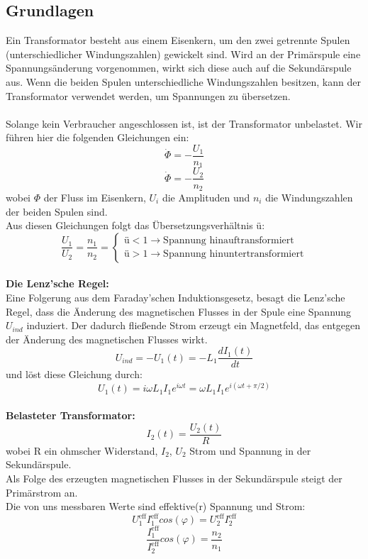 \documentclass{article}
\begin{document}
\subsection{Grundlagen}
Ein Transformator besteht aus einem Eisenkern, um den zwei getrennte Spulen (unterschiedlicher Windungszahlen) gewickelt sind. Wird an der Primärspule eine Spannungsänderung vorgenommen, wirkt sich diese auch auf die Sekundärspule aus. Wenn die beiden Spulen unterschiedliche Windungszahlen besitzen, kann der Transformator verwendet werden, um Spannungen zu übersetzen.\\
\\
Solange kein Verbraucher angeschlossen ist, ist der Transformator unbelastet. Wir führen hier die folgenden Gleichungen ein: \\
$$\dot{\Phi}=-\frac{U_1}{n_1}$$
$$\dot{\Phi}=-\frac{U_2}{n_2}$$
wobei $\Phi$ der Fluss im Eisenkern, $U_i$ die Amplituden und $n_i$ die Windungszahlen der beiden Spulen sind. \\
Aus diesen Gleichungen folgt das Übersetzungsverhältnis ü:\\

\begin{equation}
\label{uebersetzungsverhaeltnis}
\frac{U_1}{U_2}=\frac{n_1}{n_2}=\begin{cases}\textrm{ü}<1 \rightarrow\textrm{Spannung hinauftransformiert}\\\textrm{ü}>1 \rightarrow\textrm{Spannung hinuntertransformiert}\end{cases}
\end{equation}
\\
\textbf{Die Lenz'sche Regel:}\\
Eine Folgerung aus dem Faraday'schen Induktionsgesetz, besagt die Lenz'sche Regel, dass die Änderung des magnetischen Flusses in der Spule eine Spannung $U_{ind}$ induziert. Der dadurch fließende Strom erzeugt ein Magnetfeld, das entgegen der Änderung des magnetischen Flusses wirkt.\\
\begin{equation}
\label{lenzsche regel}
U_{ind}=-U_1(t)=-L_1\frac{dI_1(t)}{dt}
\end{equation}
und löst diese Gleichung durch:
\begin{equation}
\label{primaerspannung}
U_1(t)=i\omega L_1 I_1 e^{i\omega t}=\omega L_1 I_1 e^{i(\omega t + \pi / 2)}
\end{equation}
\\


\textbf{Belasteter Transformator:}
\begin{equation}
\label{belastet}
I_2(t)=\frac{U_2(t)}{R}
\end{equation}
wobei R ein ohmscher Widerstand, $I_2$, $U_2$ Strom und Spannung in der Sekundärspule.\\
Als Folge des erzeugten magnetischen Flusses in der Sekundärspule steigt der Primärstrom an. \\
Die von uns messbaren Werte sind effektive(r) Spannung und Strom:
$$U_1^{\textrm{eff}}I_1^{\textrm{eff}}cos(\varphi)=U_2^{\textrm{eff}}I_2^{\textrm{eff}}$$
$$\frac{I_1^{\textrm{eff}}}{I_2^{\textrm{eff}}}cos(\varphi)=\frac{n_2}{n_1}$$
\end{document}
